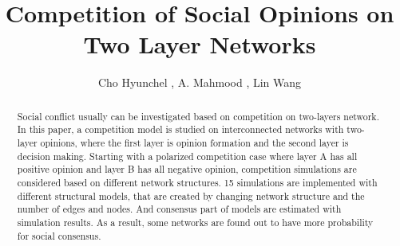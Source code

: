 \documentclass[english]{cccconf}
\begin{document}
\title{Competition of Social Opinions on Two Layer Networks}


\author{Cho Hyunchel ,
        A. Mahmood ,
        Lin Wang }

\maketitle

\begin{abstract}
Social conflict usually can be investigated based on competition on two-layers network. In this paper, a competition model is studied on interconnected networks with two-layer opinions, where the first layer is opinion formation and the second layer is decision making. Starting with a polarized competition case where layer A has all positive opinion and layer B has all negative opinion, competition simulations are considered based on different network structures. 15 simulations are implemented with different structural models, that are created by changing network structure and the number of edges and nodes. And consensus part of models are estimated with simulation results. As a result, some networks are found out to have more probability for social consensus.    

\end{abstract}


\end{document}
